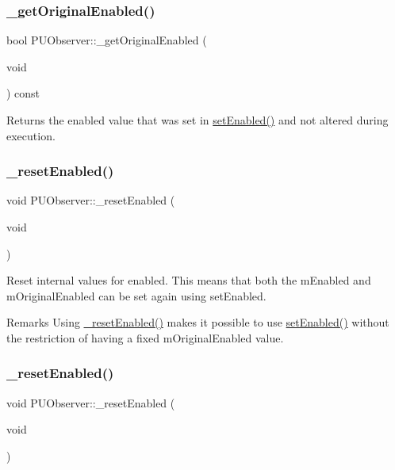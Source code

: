 \subsubsection{\texorpdfstring{\+\_\+get\+Original\+Enabled()}{\_getOriginalEnabled()}\hspace{0.1cm}{\footnotesize\ttfamily [2/2]}}
{\footnotesize\ttfamily bool P\+U\+Observer\+::\+\_\+get\+Original\+Enabled (\begin{DoxyParamCaption}\item[{void}]{ }\end{DoxyParamCaption}) const}

Returns the \textquotesingle{}enabled\textquotesingle{} value that was set in \hyperlink{classPUObserver_a5f2b1a071d5579cac1cfbc09b9871853}{set\+Enabled()} and not altered during execution. \mbox{\label{classPUObserver_a344fad62cfdc3d670e52f290a0bf20e8}} 
\subsubsection{\texorpdfstring{\+\_\+reset\+Enabled()}{\_resetEnabled()}\hspace{0.1cm}{\footnotesize\ttfamily [1/2]}}
{\footnotesize\ttfamily void P\+U\+Observer\+::\+\_\+reset\+Enabled (\begin{DoxyParamCaption}\item[{void}]{ }\end{DoxyParamCaption})}

Reset internal values for \textquotesingle{}enabled\textquotesingle{}. This means that both the m\+Enabled and m\+Original\+Enabled can be set again using set\+Enabled. \begin{DoxyRemark}{Remarks}
Using \hyperlink{classPUObserver_a344fad62cfdc3d670e52f290a0bf20e8}{\+\_\+reset\+Enabled()} makes it possible to use \hyperlink{classPUObserver_a5f2b1a071d5579cac1cfbc09b9871853}{set\+Enabled()} without the restriction of having a fixed m\+Original\+Enabled value. 
\end{DoxyRemark}
\mbox{\label{classPUObserver_a344fad62cfdc3d670e52f290a0bf20e8}} 
\subsubsection{\texorpdfstring{\+\_\+reset\+Enabled()}{\_resetEnabled()}\hspace{0.1cm}{\footnotesize\ttfamily [2/2]}}
{\footnotesize\ttfamily void P\+U\+Observer\+::\+\_\+reset\+Enabled (\begin{DoxyParamCaption}\item[{void}]{ }\end{DoxyParamCaption})}

